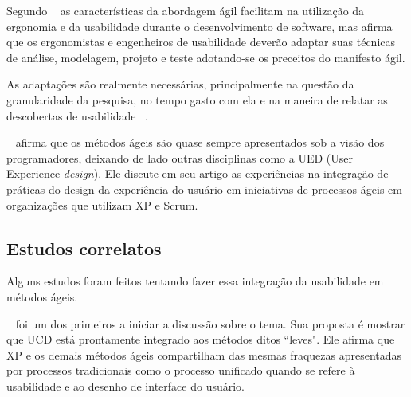 	Segundo ~ as características da abordagem ágil facilitam na utilização da ergonomia e da usabilidade durante o desenvolvimento de software, mas afirma que os ergonomistas e engenheiros de usabilidade deverão adaptar suas técnicas de análise, modelagem, projeto e teste adotando-se os preceitos do manifesto ágil.
	
	As adaptações são realmente necessárias, principalmente na questão da granularidade da pesquisa, no tempo gasto com ela e na maneira de relatar as descobertas de usabilidade ~\cite{santos2012}.


	~ afirma que os métodos ágeis são quase sempre apresentados sob a visão dos programadores, deixando de lado outras disciplinas como a UED (User Experience \emph{design}). Ele discute em seu artigo as experiências na integração de práticas do design da experiência do usuário em iniciativas de processos ágeis em organizações que utilizam XP e Scrum. %

\subsection{Estudos correlatos}

Alguns estudos foram feitos tentando fazer essa integração da usabilidade em métodos ágeis. 

~ foi um dos primeiros a iniciar a discussão sobre o tema. Sua proposta é mostrar que UCD está prontamente integrado aos métodos ditos ``leves". Ele afirma que XP e os demais métodos ágeis compartilham das mesmas fraquezas apresentadas por processos tradicionais como o processo unificado quando se refere à usabilidade e ao desenho de interface do usuário.


